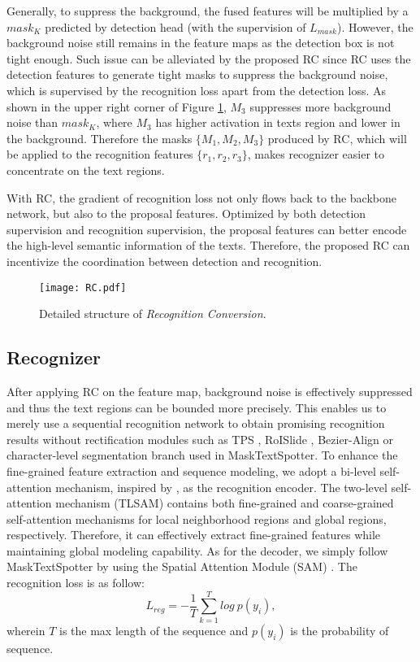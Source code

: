 \documentclass[10pt,twocolumn,letterpaper]{article}
\begin{document}
Generally, to suppress the background, the fused features will be multiplied by a $mask_{K}$ predicted by detection head (with the supervision of $L_{mask}$).
However, the background noise still remains in the feature maps as the detection box is not tight enough.
Such issue can be alleviated by the proposed RC since RC uses the detection features to generate tight masks to suppress the background noise, which is supervised by the recognition loss apart from the detection loss. 
As shown in the upper right corner of Figure \ref{fig:recognition conversion}, $M_3$ suppresses more background noise than $mask_{K}$, where $M_3$ has higher activation in texts region and lower in the background.
Therefore the masks $\{M_1,M_2,M_3\}$ produced by RC, which will be applied to the recognition features $\{r_1,r_2,r_3\}$, makes recognizer easier to concentrate on the text regions. 




With RC, the gradient of recognition loss not only flows back to the backbone network, but also to the proposal features. 
Optimized by both detection supervision and recognition supervision, the proposal features can better encode the high-level semantic information of the texts.
Therefore, the proposed RC can incentivize the coordination between detection and recognition. 

\begin{figure}[t!]
    \centering
    \texttt{[image: RC.pdf]}
    \caption{
        Detailed structure of \textit{Recognition Conversion}.
    }
    \label{fig:recognition conversion}
\end{figure}

\subsection{Recognizer}
\label{sec:recognizer}


After applying RC on the feature map, background noise is effectively suppressed and thus the text regions can be bounded more precisely. 
This enables us to merely use a sequential recognition network to obtain promising recognition results without rectification modules such as TPS \cite{bookstein1989principal}, RoISlide \cite{feng2019textdragon}, Bezier-Align \cite{liu2020abcnet} or character-level segmentation branch used in MaskTextSpotter\cite{liao2019mask}. 
To enhance the fine-grained feature extraction and sequence modeling, we adopt a bi-level self-attention mechanism, inspired by \cite{yang2021focal}, as the recognition encoder. The two-level self-attention mechanism (TLSAM) contains both fine-grained and coarse-grained self-attention mechanisms for local neighborhood regions and global regions, respectively. Therefore, it can effectively extract fine-grained features while maintaining global modeling capability.
As for the decoder, we simply follow MaskTextSpotter by using the Spatial Attention Module (SAM) \cite{liao2020mask}. The recognition loss is as follow:
\begin{equation}
L_{reg} = -\frac{1}{T} \sum_{k=1}^{T}log\ p(y_i),
\end{equation}
wherein $T$ is the max length of the sequence and $p(y_i)$ is the probability of sequence.
\end{document}
